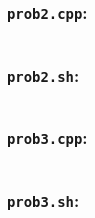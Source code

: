 \documentclass[12pt,letterpaper]{article}
\begin{document}
\inputminted[breaklines=true]{sh}{prob1.sh}

\subsubsection*{\texttt{prob2.cpp}:}

\inputminted[breaklines=true]{c}{prob2.cpp}

\subsubsection*{\texttt{prob2.sh}:}

\inputminted[breaklines=true]{sh}{prob2.sh}

\subsubsection*{\texttt{prob3.cpp}:}

\inputminted[breaklines=true]{c}{prob3.cpp}

\subsubsection*{\texttt{prob3.sh}:}

\inputminted[breaklines=true]{sh}{prob3.sh}
\end{document}
